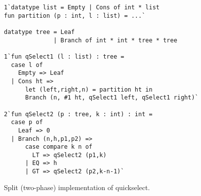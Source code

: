\begin{figure}
\begin{lstlisting}
1`datatype list = Empty | Cons of int * list
fun partition (p : int, l : list) = ...`

datatype tree = Leaf
              | Branch of int * int * tree * tree

1`fun qSelect1 (l : list) : tree =
  case l of
    Empty => Leaf
  | Cons ht => 
      let (left,right,n) = partition ht in
      Branch (n, #1 ht, qSelect1 left, qSelect1 right)`

2`fun qSelect2 (p : tree, k : int) : int = 
  case p of
    Leaf => 0
  | Branch (n,h,p1,p2) => 
      case compare k n of
        LT => qSelect2 (p1,k)
      | EQ => h
      | GT => qSelect2 (p2,k-n-1)`
\end{lstlisting}
\caption{Split (two-phase) implementation of quickselect.}
\label{fig:qs-split}
\end{figure}

